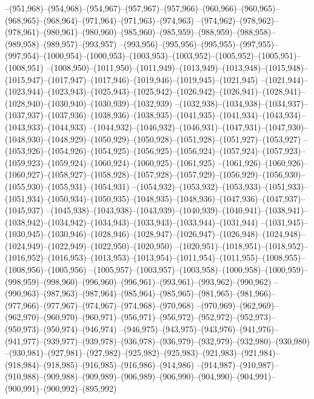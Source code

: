 --(951,968)--(954,968)--(954,967)--(957,967)--(957,966)--(960,966)--(960,965)--(968,965)--(968,964)--(971,964)--(971,963)--(974,963)
--(974,962)--(978,962)--(978,961)--(980,961)--(980,960)--(985,960)--(985,959)--(988,959)--(988,958)--(989,958)--(989,957)--(993,957)
--(993,956)--(995,956)--(995,955)--(997,955)--(997,954)--(1000,954)--(1000,953)--(1003,953)--(1003,952)--(1005,952)--(1005,951)--(1008,951)
--(1008,950)--(1011,950)--(1011,949)--(1013,949)--(1013,948)--(1015,948)--(1015,947)--(1017,947)--(1017,946)--(1019,946)--(1019,945)--(1021,945)
--(1021,944)--(1023,944)--(1023,943)--(1025,943)--(1025,942)--(1026,942)--(1026,941)--(1028,941)--(1028,940)--(1030,940)--(1030,939)--(1032,939)
--(1032,938)--(1034,938)--(1034,937)--(1037,937)--(1037,936)--(1038,936)--(1038,935)--(1041,935)--(1041,934)--(1043,934)--(1043,933)--(1044,933)
--(1044,932)--(1046,932)--(1046,931)--(1047,931)--(1047,930)--(1048,930)--(1048,929)--(1050,929)--(1050,928)--(1051,928)--(1051,927)--(1053,927)
--(1053,926)--(1054,926)--(1054,925)--(1056,925)--(1056,924)--(1057,924)--(1057,923)--(1059,923)--(1059,924)--(1060,924)--(1060,925)--(1061,925)
--(1061,926)--(1060,926)--(1060,927)--(1058,927)--(1058,928)--(1057,928)--(1057,929)--(1056,929)--(1056,930)--(1055,930)--(1055,931)--(1054,931)
--(1054,932)--(1053,932)--(1053,933)--(1051,933)--(1051,934)--(1050,934)--(1050,935)--(1048,935)--(1048,936)--(1047,936)--(1047,937)--(1045,937)
--(1045,938)--(1043,938)--(1043,939)--(1040,939)--(1040,941)--(1038,941)--(1038,942)--(1034,942)--(1034,943)--(1033,943)--(1033,944)--(1031,944)
--(1031,945)--(1030,945)--(1030,946)--(1028,946)--(1028,947)--(1026,947)--(1026,948)--(1024,948)--(1024,949)--(1022,949)--(1022,950)--(1020,950)
--(1020,951)--(1018,951)--(1018,952)--(1016,952)--(1016,953)--(1013,953)--(1013,954)--(1011,954)--(1011,955)--(1008,955)--(1008,956)--(1005,956)
--(1005,957)--(1003,957)--(1003,958)--(1000,958)--(1000,959)--(998,959)--(998,960)--(996,960)--(996,961)--(993,961)--(993,962)--(990,962)
--(990,963)--(987,963)--(987,964)--(985,964)--(985,965)--(981,965)--(981,966)--(977,966)--(977,967)--(974,967)--(974,968)--(970,968)
--(970,969)--(962,969)--(962,970)--(960,970)--(960,971)--(956,971)--(956,972)--(952,972)--(952,973)--(950,973)--(950,974)--(946,974)
--(946,975)--(943,975)--(943,976)--(941,976)--(941,977)--(939,977)--(939,978)--(936,978)--(936,979)--(932,979)--(932,980)--(930,980)
--(930,981)--(927,981)--(927,982)--(925,982)--(925,983)--(921,983)--(921,984)--(918,984)--(918,985)--(916,985)--(916,986)--(914,986)
--(914,987)--(910,987)--(910,988)--(909,988)--(909,989)--(906,989)--(906,990)--(904,990)--(904,991)--(900,991)--(900,992)--(895,992)
